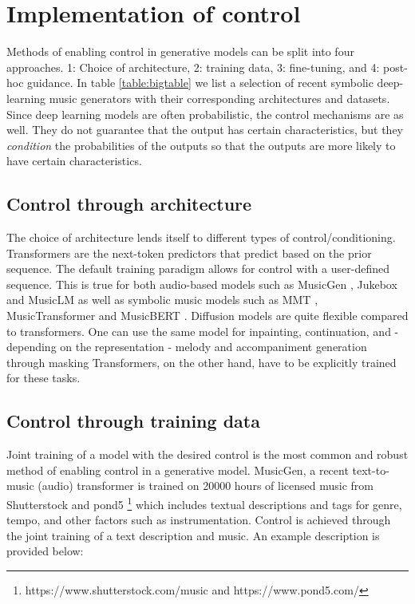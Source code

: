 \section{Implementation of control} \label{section:addingcontrol}
Methods of enabling control in generative models can be split into four approaches. 1: Choice of architecture, 2: training data, 3: fine-tuning, and 4: post-hoc guidance. In table \ref{table:bigtable} we list a selection of recent symbolic deep-learning music generators with their corresponding architectures and datasets. Since deep learning models are often probabilistic, the control mechanisms are as well. They do not guarantee that the output has certain characteristics, but they \textit{condition} the probabilities of the outputs so that the outputs are more likely to have certain characteristics. 

\subsection{Control through architecture}
The choice of architecture lends itself to different types of control/conditioning. Transformers are the next-token predictors that predict based on the prior sequence. The default training paradigm allows for control with a user-defined sequence. This is true for both audio-based models such as MusicGen \cite{copet2023simple}, Jukebox \cite{Dhariwal_Jun_Payne_Kim_Radford_Sutskever_2020} and MusicLM \cite{Agostinelli_Denk_Borsos_Engel_Verzetti_Caillon_Huang_Jansen_Roberts_Tagliasacchi_et_al._2023} as well as symbolic music models such as MMT \cite{Dong_Chen_MMT_Kirkpatrick_2023}, MusicTransformer \cite{Huang_Vaswani_Uszkoreit_Shazeer_Simon_Hawthorne_Dai_Hoffman_Dinculescu_Eck_2018} and MusicBERT \cite{Zeng_Tan_Wang_MUSICBERT_2021}. Diffusion models are quite flexible compared to transformers. One can use the same model for inpainting, continuation, and - depending on the representation - melody and accompaniment generation through masking \cite{Min_Jiang_Xia_Zhao_polyffusion_2023}\cite{Rombach_Blattmann_Lorenz_Esser_Ommer_2022}Transformers, on the other hand, have to be explicitly trained for these tasks. 

\subsection{Control through training data}
Joint training of a model with the desired control is the most common and robust method of enabling control in a generative model. MusicGen\cite{copet2023simple}, a recent text-to-music (audio) transformer is trained on 20000 hours of licensed music from Shutterstock and pond5 \footnote{https://www.shutterstock.com/music and https://www.pond5.com/} which includes textual descriptions and tags for genre, tempo, and other factors such as instrumentation. Control is achieved through the joint training of a text description and music. An example description is provided below: 

